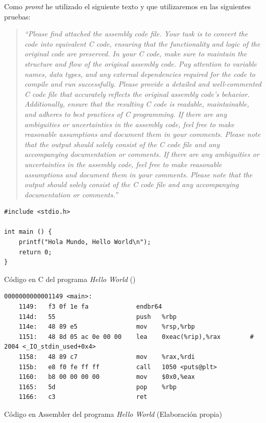 Como \textit{promt} he utilizado el siguiente texto y que utilizaremos en las siguientes
pruebas:

\begin{quote}
    \textit{``Please find attached the assembly code file. Your task is to convert the code 
    into equivalent C code, ensuring that the functionality and logic of the original code 
    are preserved.\newline
    In your C code, make sure to maintain the structure and flow of the original assembly code.
    Pay attention to variable names, data types, and any external dependencies required for
    the code to compile and run successfully.\newline
    Please provide a detailed and well-commented C code file that accurately reflects the original
    assembly code's behavior. Additionally, ensure that the resulting C code is readable, maintainable,
    and adheres to best practices of C programming.\newline
    If there are any ambiguities or uncertainties in the assembly code, feel free to make reasonable
    assumptions and document them in your comments.\newline
    Please note that the output should solely consist of the C code file and any accompanying documentation
    or comments.\newline
    If there are any ambiguities or uncertainties in the assembly code, feel free to make reasonable assumptions
    and document them in your comments.\newline
    Please note that the output should solely consist of the C code file and any accompanying
    documentation or comments.''}
\end{quote}

\begin{mycode}
    \begin{verbatim}
#include <stdio.h>

int main () {
    printf("Hola Mundo, Hello World\n");
    return 0;
}
    \end{verbatim}
    \caption[Código en C del programa \textit{Hello World}]{Código en C del programa \textit{Hello World} (\cite{HolaMundoCode})}
    \label{cod:helloWorldC}
\end{mycode}

\begin{mycode}
    \begin{verbatim}
0000000000001149 <main>:
    1149:	f3 0f 1e fa          	endbr64
    114d:	55                   	push   %rbp
    114e:	48 89 e5             	mov    %rsp,%rbp
    1151:	48 8d 05 ac 0e 00 00 	lea    0xeac(%rip),%rax        # 2004 <_IO_stdin_used+0x4>
    1158:	48 89 c7             	mov    %rax,%rdi
    115b:	e8 f0 fe ff ff       	call   1050 <puts@plt>
    1160:	b8 00 00 00 00       	mov    $0x0,%eax
    1165:	5d                   	pop    %rbp
    1166:	c3                   	ret
    \end{verbatim}
    \caption[Código en Assembler del programa \textit{Hello World}]{Código en Assembler del programa \textit{Hello World} (Elaboración propia)}
    \label{cod:helloWorldAsm}
\end{mycode}


